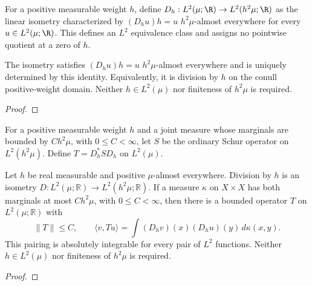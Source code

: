 \begin{supporting}
\begin{definition}
\label{def:division-weight-l2}
\leanok
For a positive measurable weight $h$, define $D_h:L^2(\mu;\R)\to L^2(h^2\mu;\R)$
as the linear isometry characterized by $(D_hu)h=u$ $h^2\mu$-almost everywhere
for every $u\in L^2(\mu;\R)$. This defines an $L^2$ equivalence class and
assigns no pointwise quotient at a zero of $h$.
\end{definition}
\begin{theorem}
\label{thm:division-weight-l2}
\leanok
The isometry satisfies $(D_hu)h=u$ $h^2\mu$-almost everywhere and is uniquely
determined by this identity. Equivalently, it is division by $h$ on the conull
positive-weight domain. Neither $h\in L^2(\mu)$ nor finiteness of $h^2\mu$ is required.
\end{theorem}
\begin{proof}
\leanok
\end{proof}

\begin{definition}
\label{def:weighted-schur-l2}
\leanok
For a positive measurable weight $h$ and a joint measure whose marginals are
bounded by $C h^2\mu$, with $0\le C<\infty$, let $S$ be the ordinary Schur
operator on $L^2(h^2\mu)$. Define $T=D_h^* S D_h$ on $L^2(\mu)$.
\end{definition}

\begin{theorem}
\label{thm:weighted-schur-l2}
\leanok
Let $h$ be real measurable and positive $\mu$-almost everywhere.
Division by $h$ is an isometry $D:L^2(\mu;\mathbb R)\to L^2(h^2\mu;\mathbb R)$.
If a measure $\kappa$ on $X\times X$ has both marginals at most
$C h^2\mu$, with $0\le C<\infty$, then there is a bounded operator $T$ on
$L^2(\mu;\mathbb R)$ with
\[
 \|T\|\le C,\qquad
 \langle v,Tu\rangle=\int (D_hv)(x)(D_hu)(y)\,d\kappa(x,y).
\]
This pairing is absolutely integrable for every pair of $L^2$ functions.
Neither $h\in L^2(\mu)$ nor finiteness of $h^2\mu$ is required.
\end{theorem}
\begin{proof}
\leanok
\end{proof}


\end{supporting}
